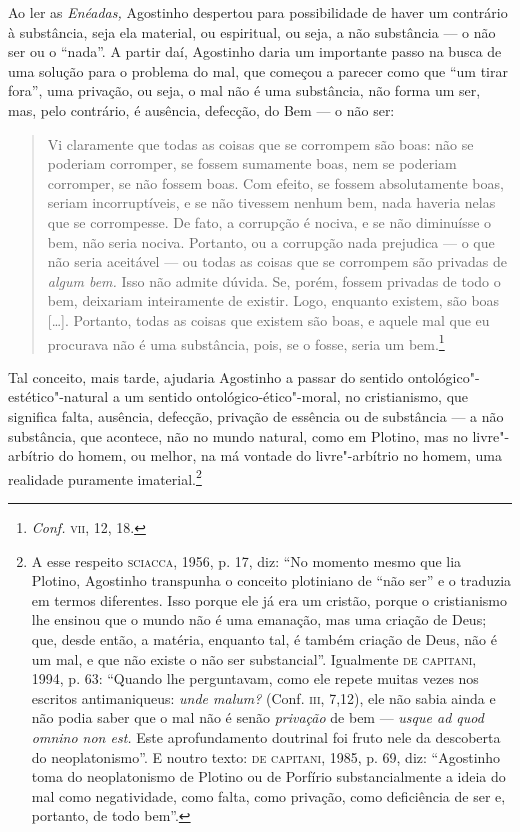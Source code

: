 Ao ler as \emph{Enéadas,}  Agostinho despertou para 
possibilidade de haver um contrário à substância, seja ela
material, ou espiritual, ou seja, a não substância --- o não ser
ou o “nada”. A partir daí, Agostinho daria um importante passo
na busca de uma solução para o problema do mal, que começou a
parecer como que “um tirar fora”, uma privação, ou seja, o mal
não é uma substância, não forma um ser, mas, pelo contrário, é
ausência, defecção, do Bem --- o não ser: 

\begin{quote}
Vi claramente que todas as coisas que se corrompem são boas: não
se poderiam corromper, se fossem sumamente boas, nem se poderiam
corromper, se não fossem boas. Com efeito, se fossem
absolutamente boas, seriam incorruptíveis, e se não tivessem
nenhum bem, nada haveria nelas que se corrompesse. De fato, a
corrupção é nociva, e se não diminuísse  o bem, não seria
nociva. Portanto, ou  a corrupção nada prejudica --- o que não
seria aceitável --- ou todas as coisas que se corrompem são
privadas de \emph{algum bem.} Isso não admite dúvida. Se,
porém, fossem privadas de todo o bem, deixariam inteiramente de
existir. Logo, enquanto existem, são boas [\ldots{}]. Portanto, todas
as coisas que existem são boas, e aquele mal que eu procurava
não é uma substância, pois, se o fosse, seria um bem.\footnote{
\emph{Conf.} \textsc{vii}, 12, 18.}
\end{quote}



Tal conceito, mais tarde,  ajudaria Agostinho a passar do sentido
ontológico"-estético"-natural  a um sentido
ontológico-ético"-moral, no cristianismo, que significa falta,
ausência, defecção, privação de essência ou de substância --- a
não substância, que acontece, não no mundo natural, como em
Plotino, mas no livre"-arbítrio do homem, ou melhor, na má
vontade do livre"-arbítrio no homem, uma realidade puramente
imaterial.\footnote{ A esse respeito \textsc{sciacca}, 1956, p. 17,  diz:
“No momento mesmo que lia Plotino, Agostinho transpunha o
conceito plotiniano de ``não ser'' e o traduzia em termos
diferentes. Isso porque ele já era um cristão, porque o
cristianismo lhe ensinou que o mundo não é uma emanação, mas uma
criação de Deus; que, desde então, a matéria, enquanto tal, é
também criação de Deus, não é um mal, e que não existe o não ser
substancial”. Igualmente \textsc{de} \textsc{capitani}, 1994, p. 63: “Quando lhe
perguntavam, como ele repete muitas vezes nos escritos
antimaniqueus: \emph{unde malum?} (Conf. \textsc{iii}, 7,12), ele não
sabia ainda e não podia saber que o mal não é senão
\emph{privação} de bem --- \emph{usque ad quod omnino non est.}
Este aprofundamento doutrinal foi fruto nele da descoberta do
neoplatonismo”. E noutro texto: \textsc{de} \textsc{capitani}, 1985, p. 69, diz:
“Agostinho toma do neoplatonismo de Plotino ou de Porfírio
substancialmente  a ideia do mal como negatividade, como falta,
como privação, como deficiência de ser e, portanto, de todo
bem”.} 



